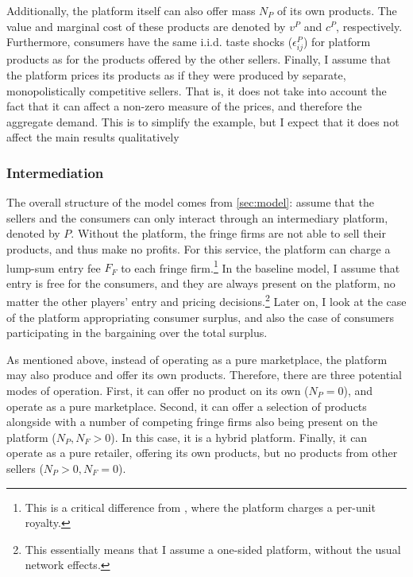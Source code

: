 \documentclass[a4paper]{article}
\begin{document}
Additionally, the platform itself can also offer mass $N_P$ of its own products.
The value and marginal cost of these products are denoted by $v^P$ and $c^P$, respectively.
Furthermore, consumers have the same i.i.d. taste shocks ($\epsilon^P_{ij}$) for platform products as for the products offered by the other sellers.
Finally, I assume that the platform prices its products as if they were produced by separate, monopolistically competitive sellers.
That is, it does not take into account the fact that it can affect a non-zero measure of the prices, and therefore the aggregate demand.
This is to simplify the example, but I expect that it does not affect the main results qualitatively

\subsubsection{Intermediation}

The overall structure of the model comes from \cref{sec:model}: assume that the sellers and the consumers can only interact through an intermediary platform, denoted by $P$.
Without the platform, the fringe firms are not able to sell their products, and thus make no profits.
For this service, the platform can charge a lump-sum entry fee $F_F$ to each fringe firm.\footnote{
    This is a critical difference from \textcite[]{anderson2021hybrid}, where the platform charges a per-unit royalty.
}
In the baseline model, I assume that entry is free for the consumers, and they are always present on the platform, no matter the other players' entry and pricing decisions.\footnote{
    This essentially means that I assume a one-sided platform, without the usual network effects.
}
Later on, I look at the case of the platform appropriating consumer surplus, and also the case of consumers participating in the bargaining over the total surplus.

As mentioned above, instead of operating as a pure marketplace, the platform may also produce and offer its own products.
Therefore, there are three potential modes of operation.
First, it can offer no product on its own ($N_P = 0$), and operate as a pure marketplace.
Second, it can offer a selection of products alongside with a number of competing fringe firms also being present on the platform ($N_P, N_F > 0$).
In this case, it is a hybrid platform.
Finally, it can operate as a pure retailer, offering its own products, but no products from other sellers ($N_P > 0, N_F = 0$).
\end{document}
